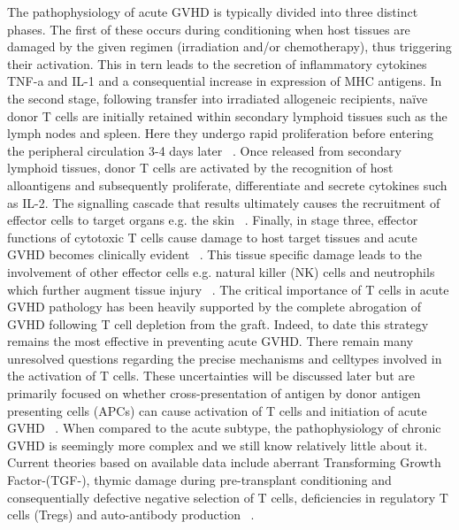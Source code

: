 The pathophysiology of acute GVHD is typically divided into three distinct phases. The first of these occurs during conditioning when host tissues are damaged by the given regimen (irradiation and/or chemotherapy), thus triggering their activation. This in tern leads to the secretion of inflammatory cytokines TNF-a and IL-1 and a consequential increase in expression of MHC antigens. In the second stage, following transfer into irradiated allogeneic recipients, na\"ive donor T cells are initially retained within secondary lymphoid tissues such as the lymph nodes and spleen. Here they undergo rapid proliferation before entering the peripheral circulation 3-4 days later ~\autocite{Cha2007}. Once released from secondary lymphoid tissues, donor T cells are activated by the recognition of host alloantigens and subsequently proliferate, differentiate and secrete cytokines such as IL-2. The signalling cascade that results ultimately causes the recruitment of effector cells to target organs e.g. the skin ~\autocite{Red2003}. Finally, in stage three, effector functions of cytotoxic T cells cause damage to host target tissues and acute GVHD becomes clinically evident ~\autocite{Buz2008}. This tissue specific damage leads to the involvement of other effector cells e.g. natural killer (NK) cells and neutrophils which further augment tissue injury ~\autocite{Bla2012}. The critical importance of T cells in acute GVHD pathology has been heavily supported by the complete abrogation of GVHD following T cell depletion from the graft. Indeed, to date this strategy remains the most effective in preventing acute GVHD. There remain many unresolved questions regarding the precise mechanisms and celltypes involved in the activation of T cells. These uncertainties will be discussed later but are primarily focused on whether cross-presentation of antigen by donor antigen presenting cells (APCs) can cause activation of T cells and initiation of acute GVHD ~\autocite{Cha2007}. When compared to the acute subtype, the pathophysiology of chronic GVHD is seemingly more complex and we still know relatively little about it. Current theories based on available data include aberrant Transforming Growth Factor-\textbeta (TGF-\textbeta), thymic damage during pre-transplant conditioning and consequentially defective negative selection of T cells, deficiencies in regulatory T cells (Tregs) and auto-antibody production ~\autocite{Aro2010}.


